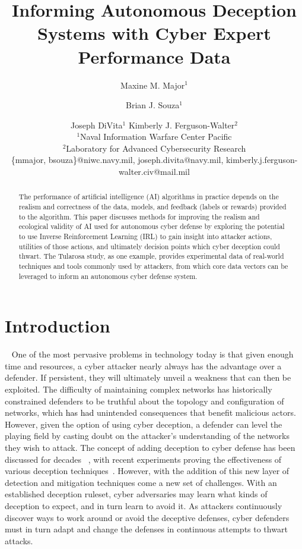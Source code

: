 \documentclass{article}
\title{Informing Autonomous Deception Systems with Cyber Expert Performance Data}
\author{
Maxine M. Major$^1$\and
Brian J. Souza$^{1}$\and
Joseph DiVita$^1$\And
Kimberly J. Ferguson-Walter$^2$\\
\affiliations
$^1$Naval Information Warfare Center Pacific\\
$^2$Laboratory for Advanced Cybersecurity Research\\
\emails
\{mmajor, bsouza\}@niwc.navy.mil, joseph.divita@navy.mil, kimberly.j.ferguson-walter.civ@mail.mil
}
\newcommand\kjf[1]{\textcolor{black}{#1}}
\begin{document}
\maketitle

\begin{abstract}
The performance of artificial intelligence (AI) algorithms in practice depends on the realism and correctness of the data, models, and feedback (labels or rewards) provided to the algorithm. This paper discusses methods for improving the realism and ecological validity of AI used for autonomous cyber defense by exploring the potential to use Inverse Reinforcement Learning (IRL) to gain insight into attacker actions, utilities of those actions, and ultimately decision points which cyber deception could thwart. The Tularosa study, as one example, provides experimental data of real-world techniques and tools commonly used by attackers, from which core data vectors can be leveraged to inform an autonomous cyber defense system. 
\end{abstract}


\section{Introduction}~\label{sec:intro}
One of the most pervasive problems in technology today is that given enough time and resources, a cyber attacker nearly always has the advantage over a defender. If persistent, they will ultimately unveil a weakness that can then be exploited. The difficulty of maintaining complex networks has historically constrained defenders to be truthful about the topology and configuration of networks, which \kjf{has had} unintended consequences that benefit malicious actors. However, given the option of using cyber deception, a defender can level the playing field by casting doubt on the attacker's understanding of the networks they wish to attack. The concept of adding deception to cyber defense has been discussed for decades~\cite{tinnel2002}\cite{yuill_2006} \cite{michael_phase_2004}, with recent experiments proving the effectiveness of various deception techniques~\cite{usenix-2021}\cite{10.1007/978-3-030-20488-4_11}\cite{moonraker-2020}. However, with the addition of this new layer of detection and mitigation techniques come a new set of challenges. With an established deception ruleset, cyber adversaries may learn what kinds of deception to expect, and in turn learn to avoid it. As attackers continuously discover ways to work around or avoid the deceptive defenses, cyber defenders must in turn adapt and change the defenses in continuous attempts to thwart attacks.
\end{document}
